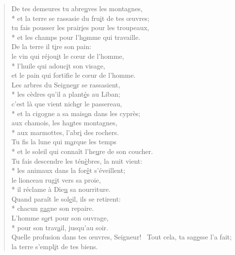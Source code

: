 \begin{verse}
De tes demeures tu abre\underline{u}ves les montagnes, \\*
et la terre se rassasie du fru\underline{i}t de tes œuvres; \\
tu fais pousser les prair\underline{i}es pour les troupeaux, \\*
et les champs pour l’h\underline{o}mme qui travaille. \\

De la terre il t\underline{i}re son pain: \\
le vin qui réjou\underline{i}t le cœur de l’homme, \\*
l’huile qui adouc\underline{i}t son visage, \\
et le pain qui fortif\underline{i}e le cœur de l’homme. \\

Les arbres du Seigne\underline{u}r se rassasient, \\*
les cèdres qu’il a plant\underline{é}s au Liban; \\
c’est là que vient nich\underline{e}r le passereau, \\*
et la cigogne a sa mais\underline{o}n dans les cyprès; \\
aux chamois, les ha\underline{u}tes montagnes, \\*
aux marmottes, l’abr\underline{i} des rochers. \\

Tu fis la lune qui m\underline{a}rque les temps \\*
et le soleil qui connaît l’he\underline{u}re de son coucher. \\
Tu fais descendre les tén\underline{è}bres, la nuit vient: \\*
les animaux dans la for\underline{ê}t s’éveillent; \\
le lionceau rug\underline{i}t vers sa proie, \\*
il réclame à Die\underline{u} sa nourriture. \\

Quand paraît le sol\underline{e}il, ils se retirent: \\*
chacun g\underline{a}gne son repaire. \\
L’homme s\underline{o}rt pour son ouvrage, \\*
pour son trav\underline{a}il, jusqu’au soir. \\

Quelle profusion dans tes œuvres, Seigneur!~\psalmdagger
Tout cela, ta sag\underline{e}sse l’a fait;~\psalmstar
la terre s’empl\underline{i}t de tes biens. \\


\end{verse}

